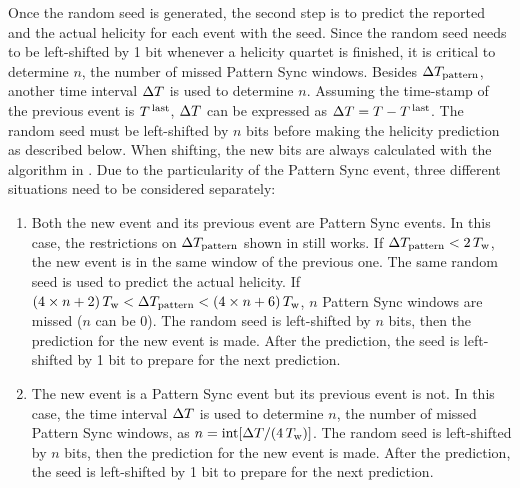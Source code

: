 Once the random seed is generated, the second step is to predict the reported and the actual helicity for each event with the seed. Since the random seed needs to be left-shifted by 1 bit whenever a helicity quartet is finished, it is critical to determine $n$, the number of missed Pattern Sync windows. Besides $\Delta T_{\text{pattern}}$, another time interval $\Delta T$ is used to determine $n$. Assuming the time-stamp of the previous event is $T^{\,\text{last}}$, $\Delta T$ can be expressed as $\Delta T=T-T^{\,\text{last}}$. The random seed must be left-shifted by $n$ bits before making the helicity prediction as described below. When shifting, the new bits are always calculated with the algorithm in . Due to the particularity of the Pattern Sync event, three different situations need to be considered separately:
\begin{enumerate}[parsep=0pt]
\item \label{A1S2SS2A3} Both the new event and its previous event are Pattern Sync events. In this case, the restrictions on $\Delta T_{\text{pattern}}$ shown in  still works. If $\Delta T_{\text{pattern}}<2\,T_{\text{w}}$, the new event is in the same window of the previous one. The same random seed is used to predict the actual helicity. If $(4\times n+2)\,T_{\text{w}}<\Delta T_{\text{pattern}}<(4\times n+6)\,T_{\text{w}}$, $n$ Pattern Sync windows are missed ($n$ can be 0). The random seed is left-shifted by $n$ bits, then the prediction for the new event is made. After the prediction, the seed is left-shifted by 1 bit to prepare for the next prediction.
\item \label{A1S2SS2A4} The new event is a Pattern Sync event but its previous event is not. In this case, the time interval $\Delta T$ is used to determine $n$, the number of missed Pattern Sync windows, as $n=\mathrm{int}[\Delta T/(4\,T_{\text{w}})]$. The random seed is left-shifted by $n$ bits, then the prediction for the new event is made. After the prediction, the seed is left-shifted by 1 bit to prepare for the next prediction.


\end{enumerate}
